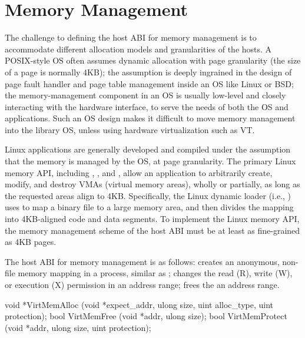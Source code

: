 \section{Memory Management}
\label{sec:abi:memory}


The challenge to defining the host ABI for memory management
is to accommodate different allocation models and granularities of the hosts.
A POSIX-style OS often assumes dynamic allocation with page granularity (the size of a page is normally 4KB);
the assumption is deeply ingrained in the design of page fault handler and page table management
inside an OS like Linux or BSD;
the memory-management component in an OS
is usually low-level and closely interacting with the hardware interface,
to serve the needs of both the OS and applications.
Such an OS design makes it difficult to move memory management
into the library OS, unless using hardware virtualization such as VT.



Linux applications 
are generally developed and compiled under the assumption that the memory is managed
by the OS,
at page granularity.
The primary Linux memory API,
including , , and ,
allow an application
to arbitrarily create, modify, and destroy VMAs (virtual memory areas),
wholly or partially,
as long as the requested areas align to
4KB.
Specifically, the Linux dynamic loader (i.e., ) %
uses  to map a binary file to a large memory area,
and then divides the mapping into 4KB-aligned code and data segments.
To implement the Linux memory API,
the memory management scheme of the host ABI
must be at least as fine-grained as 4KB pages.


The host ABI for memory management is as follows:
 creates an anonymous, non-file memory mapping in a process, similar as ;
 changes the read (R), write (W), or execution (X) permission in an address range;
 frees the an address range.




\begin{paldef}
void *VirtMemAlloc   (void *expect_addr, ulong size,
                      uint alloc_type, uint protection);
bool  VirtMemFree    (void *addr, ulong size);
bool  VirtMemProtect (void *addr, ulong size,
                      uint protection);
\end{paldef}


